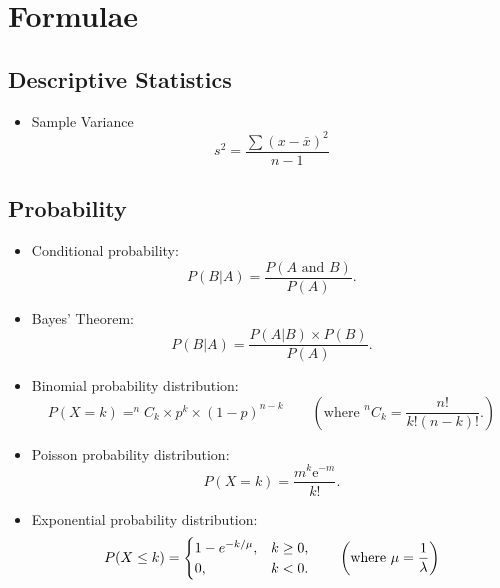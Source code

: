 \documentclass[a4paper,12pt]{article}
\begin{document}
\newpage
\section*{Formulae}
\subsection*{Descriptive Statistics}
\begin{itemize}
\item Sample Variance
\begin{equation*}
s^2 = \frac{\sum (x-\bar{x})^2}{n-1}
\end{equation*}
\end{itemize}
\subsection*{Probability}
\begin{itemize}

\item Conditional probability:
\begin{equation*}
P(B|A)=\frac{P\left( A\text{ and }B\right) }{P\left( A\right) }.
\end{equation*}


\item Bayes' Theorem:
\begin{equation*}
P(B|A)=\frac{P\left(A|B\right) \times P(B) }{P\left( A\right) }.
\end{equation*}





\item Binomial probability distribution:
\begin{equation*}
P(X = k) = ^{n}C_{k} \times p^{k} \times \left( 1-p\right) ^{n-k}\qquad \left( \text{where  }
^{n}C_{k} =\frac{n!}{k!\left(n-k\right) !}. \right)
\end{equation*}

\item Poisson probability distribution:
\begin{equation*}
P(X = k) =\frac{m^{k}\mathrm{e}^{-m}}{k!}.
\end{equation*}

\item Exponential probability distribution:
\begin{equation*}
P(X \leq k) = \begin{cases}
1-e^{- k/\mu}, & k \ge 0, \\
0, & k < 0.
\end{cases}\qquad \left( \text{where  }
\mu = {1\over \lambda}\right)
\end{equation*}
\end{itemize}
\end{document}
